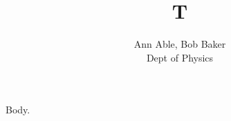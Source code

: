 \documentclass{article}
\title{T}
\author{Ann Able\footremember{a}{Univ X.}, Bob Baker\footremember{b}{Univ Y.}\\ Dept of Physics}
\begin{document}
\maketitle Body.
\end{document}
